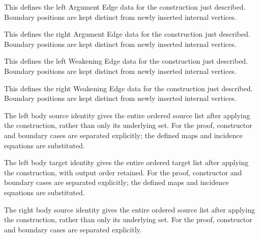 This defines the left Argument Edge data for the construction just described. Boundary positions are kept distinct from newly inserted internal vertices.
\par{}

This defines the right Argument Edge data for the construction just described. Boundary positions are kept distinct from newly inserted internal vertices.
\par{}

This defines the left Weakening Edge data for the construction just described. Boundary positions are kept distinct from newly inserted internal vertices.
\par{}

This defines the right Weakening Edge data for the construction just described. Boundary positions are kept distinct from newly inserted internal vertices.
\par{}

The left body source identity gives the entire ordered source list after applying the construction, rather than only its underlying set.
For the proof, constructor and boundary cases are separated explicitly; the defined maps and incidence equations are substituted.
\par{}

The left body target identity gives the entire ordered target list after applying the construction, with output order retained.
For the proof, constructor and boundary cases are separated explicitly; the defined maps and incidence equations are substituted.
\par{}

The right body source identity gives the entire ordered source list after applying the construction, rather than only its underlying set.
For the proof, constructor and boundary cases are separated explicitly.
\par{}


